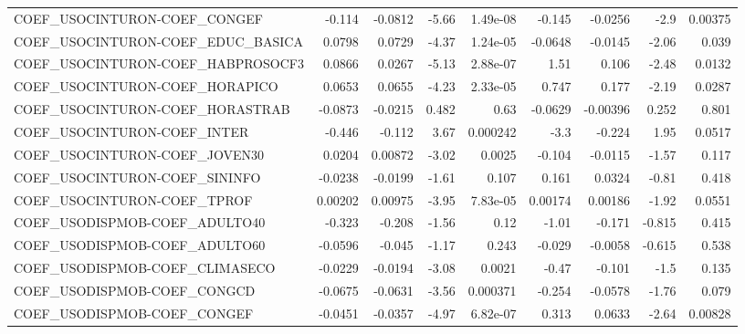 \begin{tabular}{lrrrrrrrr}
COEF\_USOCINTURON-COEF\_CONGEF          &      -0.114 &      -0.0812 &   -5.66 & 1.49e-08 &     -0.145 &     -0.0256 &         -2.9 &       0.00375 \\
COEF\_USOCINTURON-COEF\_EDUC\_BASICA     &      0.0798 &       0.0729 &   -4.37 & 1.24e-05 &    -0.0648 &     -0.0145 &        -2.06 &         0.039 \\
COEF\_USOCINTURON-COEF\_HABPROSOCF3     &      0.0866 &       0.0267 &   -5.13 & 2.88e-07 &       1.51 &       0.106 &        -2.48 &        0.0132 \\
COEF\_USOCINTURON-COEF\_HORAPICO        &      0.0653 &       0.0655 &   -4.23 & 2.33e-05 &      0.747 &       0.177 &        -2.19 &        0.0287 \\
COEF\_USOCINTURON-COEF\_HORASTRAB       &     -0.0873 &      -0.0215 &   0.482 &     0.63 &    -0.0629 &    -0.00396 &        0.252 &         0.801 \\
COEF\_USOCINTURON-COEF\_INTER           &      -0.446 &       -0.112 &    3.67 & 0.000242 &       -3.3 &      -0.224 &         1.95 &        0.0517 \\
COEF\_USOCINTURON-COEF\_JOVEN30         &      0.0204 &      0.00872 &   -3.02 &   0.0025 &     -0.104 &     -0.0115 &        -1.57 &         0.117 \\
COEF\_USOCINTURON-COEF\_SININFO         &     -0.0238 &      -0.0199 &   -1.61 &    0.107 &      0.161 &      0.0324 &        -0.81 &         0.418 \\
COEF\_USOCINTURON-COEF\_TPROF           &     0.00202 &      0.00975 &   -3.95 & 7.83e-05 &    0.00174 &     0.00186 &        -1.92 &        0.0551 \\
COEF\_USODISPMOB-COEF\_ADULTO40         &      -0.323 &       -0.208 &   -1.56 &     0.12 &      -1.01 &      -0.171 &       -0.815 &         0.415 \\
COEF\_USODISPMOB-COEF\_ADULTO60         &     -0.0596 &       -0.045 &   -1.17 &    0.243 &     -0.029 &     -0.0058 &       -0.615 &         0.538 \\
COEF\_USODISPMOB-COEF\_CLIMASECO        &     -0.0229 &      -0.0194 &   -3.08 &   0.0021 &      -0.47 &      -0.101 &         -1.5 &         0.135 \\
COEF\_USODISPMOB-COEF\_CONGCD           &     -0.0675 &      -0.0631 &   -3.56 & 0.000371 &     -0.254 &     -0.0578 &        -1.76 &         0.079 \\
COEF\_USODISPMOB-COEF\_CONGEF           &     -0.0451 &      -0.0357 &   -4.97 & 6.82e-07 &      0.313 &      0.0633 &        -2.64 &       0.00828 \\

\end{tabular}
